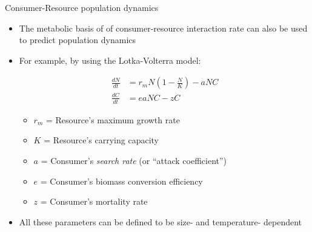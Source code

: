 \begin{frame}{Consumer-Resource population dynamics}

\begin{itemize}[<+->] \itemsep2pt
  \item The metabolic basis of of consumer-resource interaction rate can also be used to predict population dynamics 
  \item For example, by using the Lotka-Volterra model\footnotemark :
  {\footnotesize
  \begin{align*}
      \frac{dN}{dt} &= r_m N \left(1-\frac{N}{K}\right) - a N C\\
      \frac{dC}{dt} &= e a N C - z C
    \end{align*}\par}
     \begin{itemize}
       \item $r_m$ = Resource's maximum growth rate
       \item $K$ = Resource's carrying capacity
       \item $a$ = Consumer's {\it search rate} (or ``attack coefficient'')
       \item $e$ = Consumer's biomass conversion efficiency
       \item $z$ = Consumer's mortality rate
     \end{itemize} 
  \item All these parameters can be defined to be size- and temperature- dependent
\end{itemize}

  
\end{frame}

